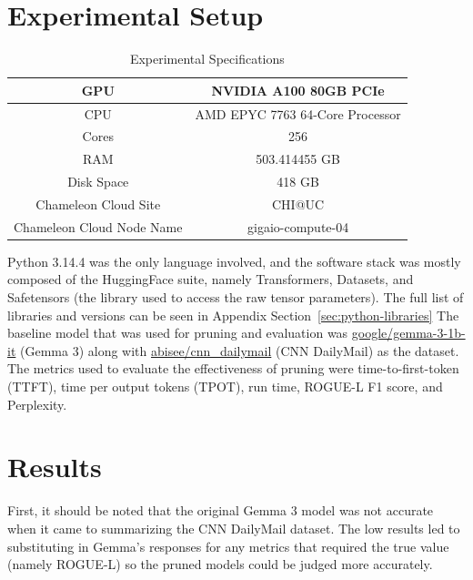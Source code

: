\documentclass[
	title={Lottery Ticket Hypothesis for Large Language Models}
]{cs595project}
\newcommand{\ROUGE}{ROGUE}
\begin{document}
\section{Experimental Setup}\label{sec:experimental-setup}
\begin{table}[H]
	\centering
	\caption{Experimental Specifications}
	\label{tab:experiment-specs}
	\begin{tabular}{|c|c|}
		\toprule
		GPU & NVIDIA A100 80GB PCIe\\
		\midrule
		CPU & AMD EPYC 7763 64-Core Processor\\
		\midrule
		Cores & 256\\
		\midrule
		RAM & 503.414455 GB\\
		\midrule
		Disk Space & 418 GB\\
		\midrule
		Chameleon Cloud Site & CHI@UC\\
		\midrule
		Chameleon Cloud Node Name & gigaio-compute-04\\
		\bottomrule
	\end{tabular}
\end{table}

Python 3.14.4 was the only language involved, and the software stack was mostly composed of the HuggingFace suite, namely Transformers, Datasets, and Safetensors (the library used to access the raw tensor parameters).
The full list of libraries and versions can be seen in Appendix Section~\ref{sec:python-libraries}
The baseline model that was used for pruning and evaluation was \href{https://huggingface.co/google/gemma-3-1b-it/tree/dcc83ea841ab6100d6b47a070329e1ba4cf78752}{google/gemma-3-1b-it} (Gemma 3) along with \href{https://huggingface.co/datasets/abisee/cnn_dailymail/tree/96df5e686bee6baa90b8bee7c28b81fa3fa6223d}{abisee/cnn\_dailymail} (CNN DailyMail) as the dataset.
The metrics used to evaluate the effectiveness of pruning were time-to-first-token (TTFT), time per output tokens (TPOT), run time, ROGUE-L F1 score, and Perplexity.

\section{Results}\label{sec:results}
First, it should be noted that the original Gemma 3 model was not accurate when it came to summarizing the CNN DailyMail dataset.
The low results led to substituting in Gemma's responses for any metrics that required the true value (namely \ROUGE-L) so the pruned models could be judged more accurately.
\end{document}
